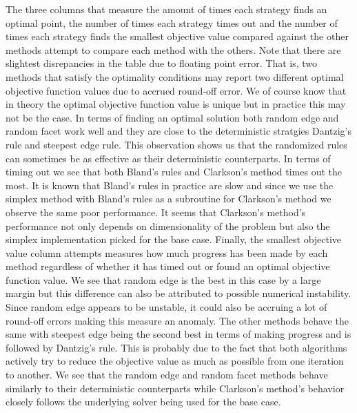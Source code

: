 \documentclass{standalone}
\begin{document}
  The three columns that measure the amount of times each strategy finds an optimal point, the number of times each strategy times out and the number of times each strategy finds the smallest objective value compared against the other methods attempt to compare each method with the others. Note that there are slightest disrepancies in the table due to floating point error. That is, two methods that satisfy the optimality conditions may report two different optimal objective function values due to accrued round-off error. We of course know that in theory the optimal objective function value is unique but in practice this may not be the case. In terms of finding an optimal solution both random edge and random facet work well and they are close to the deterministic stratgies Dantzig's rule and steepest edge rule. This observation shows us that the randomized rules can sometimes be as effective as their deterministic counterparts. In terms of timing out we see that both Bland's rules and Clarkson's method times out the most. It is known that Bland's rules in practice are slow and since we use the simplex method with Bland's rules as a subroutine for Clarkson's method we observe the same poor performance. It seems that Clarkson's method's performance not only depends on dimensionality of the problem but also the simplex implementation picked for the base case. Finally, the smallest objective value column attempts measures how much progress has been made by each method regardless of whether it has timed out or found an optimal objective function value. We see that random edge is the best in this case by a large margin but this difference can also be attributed to possible numerical instability. Since random edge appears to be unstable, it could also be accruing a lot of round-off errors making this measure an anomaly. The other methods behave the same with steepest edge being the second best in terms of making progress and is followed by Dantzig's rule. This is probably due to the fact that both algorithms actively try to reduce the objective value as much as possible from one iteration to another. We see that the random edge and random facet methods behave similarly to their deterministic counterparts while Clarkson's method's behavior closely follows the underlying solver being used for the base case.\par
\end{document}
